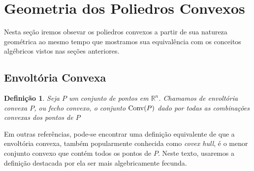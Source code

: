 \newtheorem{def:convex hull}[def:conjunto convexo]{Definição}
\newtheorem{def:independencia convexa}[def:conjunto convexo]{Definição}
\newtheorem{def:simplex}[def:conjunto convexo]{Definição}
\newtheorem{def:combinação afim}[def:conjunto convexo]{Definição}

\newtheorem{prop:redundancia}[prop:combinação convexa]{Proposição}
\newtheorem{prop:pontos extremos na fronteira}[prop:combinação convexa]{Proposição}
\newtheorem{prop:conjuntos convexos fechados}[prop:combinação convexa]{Proposição}
\newtheorem{prop:conjuntos convexos limitados}[prop:combinação convexa]{Proposição}

\newtheorem{lemma:afim}{Lema}[chapter]

\newtheorem{thm:caratheodory}{Teorema}[chapter]
\newtheorem{thm:conjuntos convexos compactos}[thm:caratheodory]{Teorema}

\newtheorem{cor:caratheodory}{Corolário}[chapter]

\section{Geometria dos Poliedros Convexos}

Nesta seção iremos obsevar os poliedros convexos a partir de sua
natureza geométrica ao mesmo tempo que mostramos sua equivalência com
os conceitos algébricos vistos nas seções anteriores.

\subsection{Envoltória Convexa}

\begin{def:convex hull}
	\label{def:convex hull}
	Seja $P$ um conjunto de pontos em $\mathbb{R}^n$. Chamamos de envoltória
	convexa $P$, ou fecho convexo, o conjunto
	$\mathrm{Conv}(P)$ dado por todas as combinações convexas dos pontos de $P$
\end{def:convex hull}

Em outras referências, pode-se encontrar uma definição equivalente de que a
envoltória convexa, também popularmente conhecida como \textit{covex hull},
é o menor conjunto convexo que contém todos os pontos de $P$. Neste texto,
usaremos a definição destacada por ela ser mais algebricamente fecunda.


